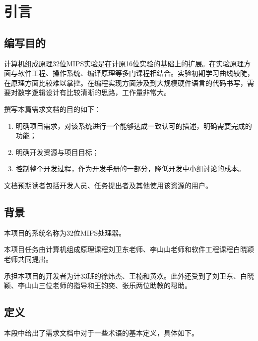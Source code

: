 \newpage
\section{引言}
\subsection{编写目的}
计算机组成原理32位MIPS实验是在计原16位实验的基础上的扩展。在实验原理方面与软件工程、操作系统、编译原理等多门课程相结合。实验初期学习曲线较陡，在原理方面比较难以掌控。在编程实现方面涉及到大规模硬件语言的代码书写，需要对数字逻辑设计有比较清晰的思路，工作量非常大。

撰写本篇需求文档的目的如下：
\begin{enumerate}
	\item 明确项目需求，对该系统进行一个能够达成一致认可的描述，明确需要完成的功能；
	\item 明确开发资源与项目目标；
	\item 控制整个开发过程，作为开发手册的一部分，降低开发中小组讨论的成本。
\end{enumerate}

文档预期读者包括开发人员、任务提出者及其他使用该资源的用户。
\subsection{背景}
本项目的系统名称为32位MIPS处理器。

本项目任务由计算机组成原理课程刘卫东老师、李山山老师和软件工程课程白晓颖老师共同提出。

承担本项目的开发者为计33班的徐炜杰、王楠和黄欢。此外还受到了刘卫东、白晓颖、李山山三位老师的指导和王钧奕、张乐两位助教的帮助。
\subsection{定义}
本段中给出了需求文档中对于一些术语的基本定义，具体如下。

